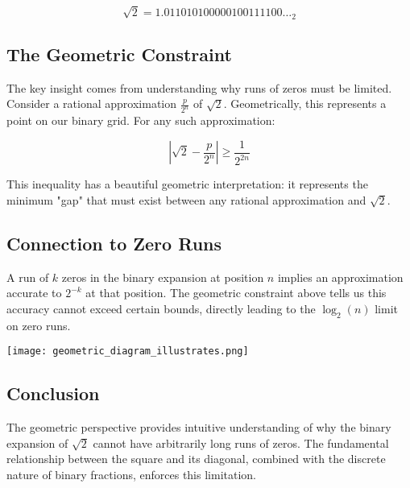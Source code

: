 $$\sqrt{2} = 1.011010100000100111100\ldots_2$$

\subsection{The Geometric Constraint}
The key insight comes from understanding why runs of zeros must be limited. Consider a rational approximation $\frac{p}{2^n}$ of $\sqrt{2}$. Geometrically, this represents a point on our binary grid. For any such approximation:

$$\left|\sqrt{2} - \frac{p}{2^n}\right| \geq \frac{1}{2^{2n}}$$

This inequality has a beautiful geometric interpretation: it represents the minimum "gap" that must exist between any rational approximation and $\sqrt{2}$.

\subsection{Connection to Zero Runs}
A run of $k$ zeros in the binary expansion at position $n$ implies an approximation accurate to $2^{-k}$ at that position. The geometric constraint above tells us this accuracy cannot exceed certain bounds, directly leading to the $\log_2(n)$ limit on zero runs.

\begin{center}
    \texttt{[image: geometric\_diagram\_illustrates.png]} %
\end{center}

\subsection{Conclusion}
The geometric perspective provides intuitive understanding of why the binary expansion of $\sqrt{2}$ cannot have arbitrarily long runs of zeros. The fundamental relationship between the square and its diagonal, combined with the discrete nature of binary fractions, enforces this limitation.

